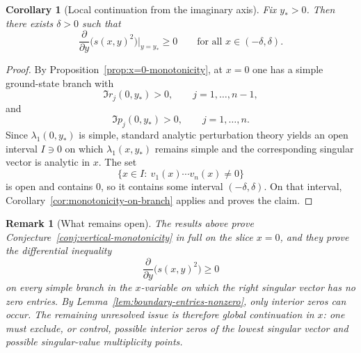 \documentclass[11pt]{article}
\newtheorem{corollary}[theorem]{Corollary}
\newtheorem{remark}[theorem]{Remark}
\begin{document}
\begin{corollary}[Local continuation from the imaginary axis]\label{cor:local-continuation-from-x0}
Fix \(y_*>0\). Then there exists \(\delta>0\) such that
\[
\frac{\partial}{\partial y}\bigl(s(x,y)^2\bigr)\Big|_{y=y_*}\ge 0
\qquad
\text{for all }x\in(-\delta,\delta).
\]
\end{corollary}

\begin{proof}
By Proposition~\ref{prop:x=0-monotonicity}, at \(x=0\) one has a simple ground-state branch with
\[
\Im r_j(0,y_*)>0,
\qquad
j=1,\dots,n-1,
\]
and
\[
\Im p_j(0,y_*)>0,
\qquad
j=1,\dots,n.
\]
Since \(\lambda_1(0,y_*)\) is simple, standard analytic perturbation theory yields an open interval \(I\ni 0\) on which \(\lambda_1(x,y_*)\) remains simple and the corresponding singular vector is analytic in \(x\). The set
\[
\{x\in I:\ v_1(x)\cdots v_n(x)\neq 0\}
\]
is open and contains \(0\), so it contains some interval \((-\delta,\delta)\). On that interval, Corollary~\ref{cor:monotonicity-on-branch} applies and proves the claim.
\end{proof}

\begin{remark}[What remains open]\label{rem:remaining-gap-monotonicity}
The results above prove Conjecture~\ref{conj:vertical-monotonicity} in full on the slice \(x=0\), and they prove the differential inequality
\[
\frac{\partial}{\partial y}\bigl(s(x,y)^2\bigr)\ge 0
\]
on every simple branch in the \(x\)-variable on which the right singular vector has no zero entries. By Lemma~\ref{lem:boundary-entries-nonzero}, only interior zeros can occur. The remaining unresolved issue is therefore global continuation in \(x\): one must exclude, or control, possible interior zeros of the lowest singular vector and possible singular-value multiplicity points.
\end{remark}
\end{document}
